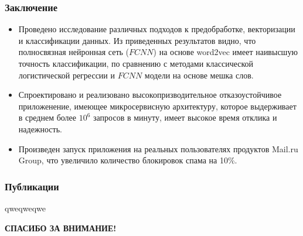 \documentclass[compress,professionalfont]{beamer}
\begin{document}
\begin{frame}
\frametitle{Заключение}

\begin{itemize}
\item Проведено исследование различных подходов к предобработке, векторизации и классификации данных. Из приведенных результатов видно, что полносвязная нейронная сеть ($FCNN$) на основе word2vec имеет наивысшую точность классификации, по сравнению с методами классической логистической регрессии и $FCNN$ модели на основе мешка слов.

\item Спроектировано и реализовано высокопризводительное отказоустойчивое приложенение, имеющее микросервисную архитектуру, которое выдерживает в среднем более $10^6$ запросов в минуту, имеет высокое время отклика и надежность.

\item Произведен запуск приложения на реальных пользователях продуктов Mail.ru Group, что увеличило количество блокировок спама на 10\%.
\end{itemize}

\end{frame}

\begin{frame}
\frametitle{Публикации}

\begin{center}
qweqweqwe
\end{center}

\end{frame}

\begin{frame}

\begin{center}
\Large\bf СПАСИБО ЗА ВНИМАНИЕ!
\end{center}

\end{frame}
\end{document}
